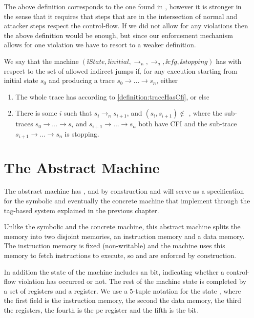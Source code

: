 The above definition corresponds to the one found in \cite{abadi2005}, however
it is stronger in the sense that it requires that steps that are in the
intersection of normal and attacker steps respect the control-flow. If we did
not allow for any violations then the above definition would be enough, but
since our enforcement mechanism allows for one violation we have to resort to a
weaker definition.

\begin{definition}[CFI]\label{definition:CFI}
  We say that the machine
  $(\ii{State}, \ii{initial}, \to_n,\allowbreak \to_a, \ii{cfg}, \ii{stopping})$
  has \CFI with respect to the set of allowed indirect jumps \CFG
  if, for any execution starting from initial state $s_0$
  and producing a trace $s_0 \to \ldots \to s_n$, either
  \begin{enumerate}
  \item The whole trace has \CFI according to
    \autoref{definition:traceHasCfi}, or else
  \item There is some $i$ such that $s_i \to_n s_{i+1}$,
  and $(s_i, s_{i+1}) \not \in$ \SUCC, where
  the sub-traces $s_0 \to \ldots \to s_i$ and
  $s_{i+1} \to \ldots \to s_n$ both have CFI
  and the sub-trace $s_{i+1} \to \ldots \to s_n$ is stopping.
  \end{enumerate}
\end{definition}

\section{The Abstract Machine}\label{sec:abstract_cfi}

The abstract machine
has \CFI, \NXD and \NWC by construction and will serve as a 
specification for the symbolic and eventually the concrete machine that
implement \CFI through the tag-based system explained in the previous chapter.

Unlike the symbolic and the concrete machine, this abstract machine splits the 
memory into two disjoint memories, an instruction memory and a data memory. The
instruction memory is fixed (non-writable) and the machine uses this memory to
fetch instructions to execute, so \NWC and \NXD are enforced by construction.

In addition the state of the machine includes an \ok bit, indicating 
whether a control-flow violation has occurred or not. The rest of the machine
state is completed by a set of registers and a \pc register. We use a 5-tuple
notation for the state \acfistat{\imem}{\dmem}{\reg}{\pc}{\ok}, where the first
field is the instruction memory, the second the data memory, the third the
registers, the fourth is the pc register and the fifth is the \ok bit.


